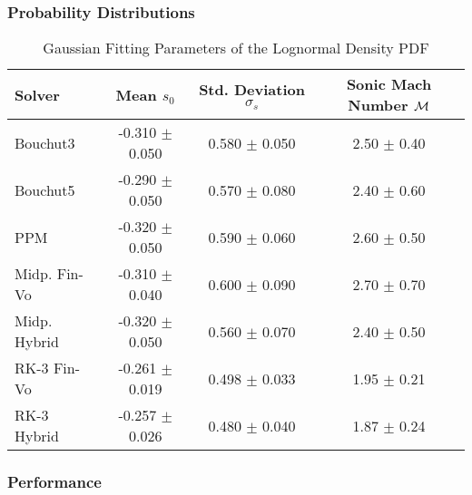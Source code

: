 \subsubsection{Probability Distributions}

\begin{table}[H]
\fontsize{3mm}{3mm}\selectfont
\captionsetup{width=.8\textwidth}
\caption{Gaussian Fitting Parameters of the Lognormal Density PDF}
\centering
\begin{tabular}{lccc}
\toprule
Solver & Mean $s_0$ & Std. Deviation $\sigma_s$ & Sonic Mach Number $\mathcal{M}$ \\
\midrule
Bouchut3	    & -0.310 $\pm$ 0.050    & 0.580 $\pm$ 0.050	& 2.50 $\pm$ 0.40\\
Bouchut5	    & -0.290 $\pm$ 0.050    & 0.570 $\pm$ 0.080	& 2.40 $\pm$ 0.60\\
PPM     	    & -0.320 $\pm$ 0.050    & 0.590 $\pm$ 0.060	& 2.60 $\pm$ 0.50\\
Midp. Fin-Vo	& -0.310 $\pm$ 0.040    & 0.600 $\pm$ 0.090	& 2.70 $\pm$ 0.70\\
Midp. Hybrid	& -0.320 $\pm$ 0.050    & 0.560 $\pm$ 0.070	& 2.40 $\pm$ 0.50\\
RK-3  Fin-Vo	& -0.261 $\pm$ 0.019	& 0.498 $\pm$ 0.033	& 1.95 $\pm$ 0.21\\
RK-3  Hybrid	& -0.257 $\pm$ 0.026	& 0.480 $\pm$ 0.040	& 1.87 $\pm$ 0.24\\
\bottomrule
\end{tabular}
\label{tab:pdf-dens-vw}
\end{table}




\subsubsection{Performance}
